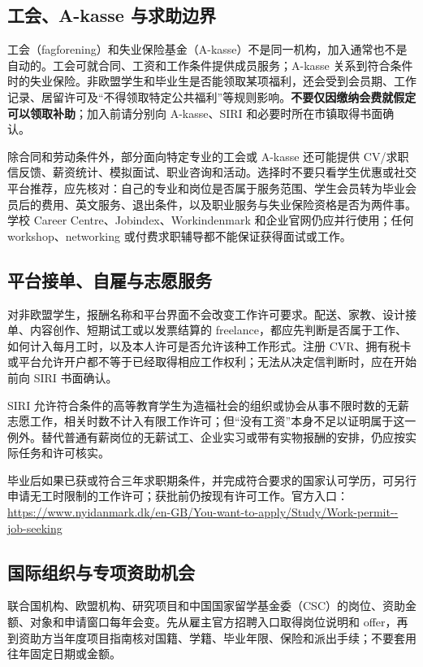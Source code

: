 \subsection{工会、A-kasse 与求助边界}

工会（fagforening）和失业保险基金（A-kasse）不是同一机构，加入通常也不是自动的。工会可就合同、工资和工作条件提供成员服务；A-kasse 关系到符合条件时的失业保险。非欧盟学生和毕业生是否能领取某项福利，还会受到会员期、工作记录、居留许可及“不得领取特定公共福利”等规则影响。\textbf{不要仅因缴纳会费就假定可以领取补助}；加入前请分别向 A-kasse、SIRI 和必要时所在市镇取得书面确认。

除合同和劳动条件外，部分面向特定专业的工会或 A-kasse 还可能提供 CV/求职信反馈、薪资统计、模拟面试、职业咨询和活动。选择时不要只看学生优惠或社交平台推荐，应先核对：自己的专业和岗位是否属于服务范围、学生会员转为毕业会员后的费用、英文服务、退出条件，以及职业服务与失业保险资格是否为两件事。学校 Career Centre、Jobindex、Workindenmark 和企业官网仍应并行使用；任何 workshop、networking 或付费求职辅导都不能保证获得面试或工作。

\subsection{平台接单、自雇与志愿服务}

对非欧盟学生，报酬名称和平台界面不会改变工作许可要求。配送、家教、设计接单、内容创作、短期试工或以发票结算的 freelance，都应先判断是否属于工作、如何计入每月工时，以及本人许可是否允许该种工作形式。注册 CVR、拥有税卡或平台允许开户都不等于已经取得相应工作权利；无法从决定信判断时，应在开始前向 SIRI 书面确认。

SIRI 允许符合条件的高等教育学生为造福社会的组织或协会从事不限时数的无薪志愿工作，相关时数不计入有限工作许可；但“没有工资”本身不足以证明属于这一例外。替代普通有薪岗位的无薪试工、企业实习或带有实物报酬的安排，仍应按实际任务和许可核实。

毕业后如果已获或符合三年求职期条件，并完成符合要求的国家认可学历，可另行申请无工时限制的工作许可；获批前仍按现有许可工作。官方入口：\url{https://www.nyidanmark.dk/en-GB/You-want-to-apply/Study/Work-permit--job-seeking}

\subsection{国际组织与专项资助机会}

联合国机构、欧盟机构、研究项目和中国国家留学基金委（CSC）的岗位、资助金额、对象和申请窗口每年会变。先从雇主官方招聘入口取得岗位说明和 offer，再到资助方当年度项目指南核对国籍、学籍、毕业年限、保险和派出手续；不要套用往年固定日期或金额。

